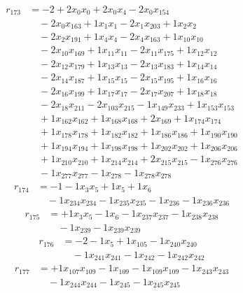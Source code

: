 \[\begin{aligned}
r_{173} &= - 2 + 2 x_{0} x_{0} + 2 x_{0} x_{4} - 2 x_{0} x_{154} \\
 &\quad - 2 x_{0} x_{163} + 1 x_{1} x_{1} - 2 x_{1} x_{203} + 1 x_{2} x_{2} \\
 &\quad - 2 x_{2} x_{191} + 1 x_{4} x_{4} - 2 x_{4} x_{163} + 1 x_{10} x_{10} \\
 &\quad - 2 x_{10} x_{169} + 1 x_{11} x_{11} - 2 x_{11} x_{175} + 1 x_{12} x_{12} \\
 &\quad - 2 x_{12} x_{179} + 1 x_{13} x_{13} - 2 x_{13} x_{183} + 1 x_{14} x_{14} \\
 &\quad - 2 x_{14} x_{187} + 1 x_{15} x_{15} - 2 x_{15} x_{195} + 1 x_{16} x_{16} \\
 &\quad - 2 x_{16} x_{199} + 1 x_{17} x_{17} - 2 x_{17} x_{207} + 1 x_{18} x_{18} \\
 &\quad - 2 x_{18} x_{211} - 2 x_{103} x_{215} - 1 x_{149} x_{233} + 1 x_{153} x_{153} \\
 &\quad + 1 x_{162} x_{162} + 1 x_{168} x_{168} + 2 x_{169} + 1 x_{174} x_{174} \\
 &\quad + 1 x_{178} x_{178} + 1 x_{182} x_{182} + 1 x_{186} x_{186} + 1 x_{190} x_{190} \\
 &\quad + 1 x_{194} x_{194} + 1 x_{198} x_{198} + 1 x_{202} x_{202} + 1 x_{206} x_{206} \\
 &\quad + 1 x_{210} x_{210} + 1 x_{214} x_{214} + 2 x_{215} x_{215} - 1 x_{276} x_{276} \\
 &\quad - 1 x_{277} x_{277} - 1 x_{278} - 1 x_{278} x_{278}
\end{aligned}\]
\[\begin{aligned}
r_{174} &= - 1 - 1 x_{3} x_{5} + 1 x_{5} + 1 x_{6} \\
 &\quad - 1 x_{234} x_{234} - 1 x_{235} x_{235} - 1 x_{236} - 1 x_{236} x_{236}
\end{aligned}\]
\[\begin{aligned}
r_{175} &= + 1 x_{3} x_{5} - 1 x_{6} - 1 x_{237} x_{237} - 1 x_{238} x_{238} \\
 &\quad - 1 x_{239} - 1 x_{239} x_{239}
\end{aligned}\]
\[\begin{aligned}
r_{176} &= - 2 - 1 x_{5} + 1 x_{105} - 1 x_{240} x_{240} \\
 &\quad - 1 x_{241} x_{241} - 1 x_{242} - 1 x_{242} x_{242}
\end{aligned}\]
\[\begin{aligned}
r_{177} &= + 1 x_{107} x_{109} - 1 x_{109} - 1 x_{109} x_{109} - 1 x_{243} x_{243} \\
 &\quad - 1 x_{244} x_{244} - 1 x_{245} - 1 x_{245} x_{245}
\end{aligned}\]

